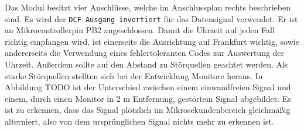 \begin{figure}
  \vspace{-25pt}
  \begin{center}
  \end{center}
  \vspace{-20pt}
\end{figure}
%
Das Modul besitzt vier Anschlüsse, welche im Anschlussplan rechts beschrieben sind. Es wird der \texttt{DCF Ausgang invertiert} für das Datensignal verwendet. Er ist an Mikrocontrollerpin PB2 angeschlossen. Damit die Uhrzeit auf jeden Fall richtig empfangen wird, ist einerseits die Ausrichtung auf Frankfurt wichtig, sowie andererseits die Verwendung eines fehlertoleranten Codes zur Auswertung der Uhrzeit. Außerdem sollte auf den Abstand zu Störquellen geachtet werden. Als starke Störquellen stellten sich bei der Entwicklung Monitore heraus. In Abbildung TODO ist der Unterschied zwischen einem einwandfreien Signal und einem, durch einen Monitor in 2 m Entfernung, gestörtem Signal abgebildet. Es ist zu erkennen, dass das Signal plötzlich im Mikrosekundenbereich gleichmäßig alterniert, also von dem ursprünglichen Signal nichts mehr zu erkennen ist.

